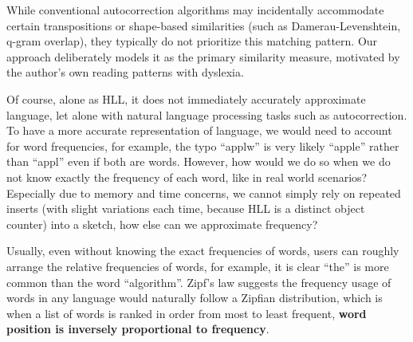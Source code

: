 \documentclass[12pt,a4paper]{article}
\begin{document}
While conventional autocorrection algorithms may incidentally accommodate certain transpositions or shape-based similarities (such as Damerau-Levenshtein, q-gram overlap), they typically do not prioritize this matching pattern. Our approach deliberately models it as the primary similarity measure, motivated by the author's own reading patterns with dyslexia. \newline


\vspace{1.0em}
Of course, alone as HLL, it does not immediately accurately approximate language, let alone with natural language processing tasks such as autocorrection. To have a more accurate representation of language, we would need to account for word frequencies, for example, the typo ``applw'' is very likely ``apple'' rather than ``appl'' even if both are words. However, how would we do so when we do not know exactly the frequency of each word, like in real world scenarios? Especially due to memory and time concerns, we cannot simply rely on repeated inserts (with slight variations each time, because HLL is a distinct object counter) into a sketch, how else can we approximate frequency? \newline

Usually, even without knowing the exact frequencies of words, users can roughly arrange the relative frequencies of words, for example, it is clear ``the'' is more common than the word ``algorithm''. Zipf's law suggests the frequency usage of words in any language would naturally follow a Zipfian distribution, which is when a list of words is ranked in order from most to least frequent, \textbf{word position is inversely proportional to frequency}. \newline
\end{document}
